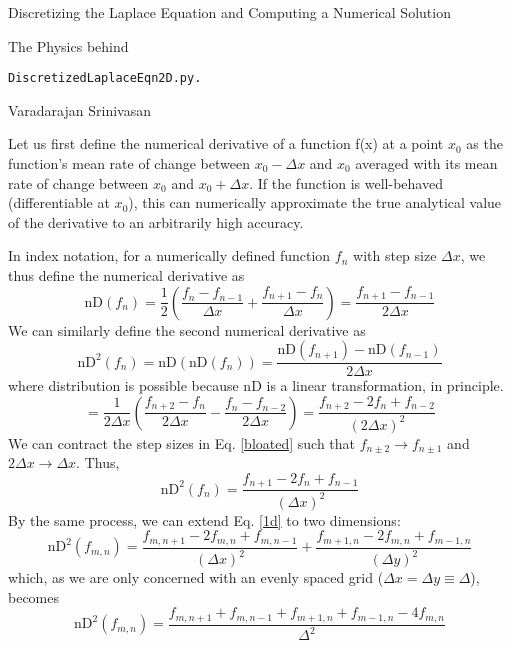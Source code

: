 \documentclass{article}
\begin{document}
\begin{flushleft}
{\large Discretizing the Laplace Equation and Computing a Numerical Solution}
\end{flushleft}
The Physics behind
\vspace{-2ex}
\begin{verbatim}
DiscretizedLaplaceEqn2D.py.
\end{verbatim}
\begin{flushright}
\smallskip
Varadarajan Srinivasan
\end{flushright}

\smallskip

Let us first define the numerical derivative of a function f(x) at a point $x_0$ as the function's mean rate of change between $x_0-\Delta x$ and $x_0$ averaged with its mean rate of change between $x_0$ and $x_0+\Delta x$. If the function is well-behaved (differentiable at $x_0$), this can numerically approximate the true analytical value of the derivative to an arbitrarily high accuracy.

In index notation, for a numerically defined function $f_n$ with step size $\Delta x$, we thus define the numerical derivative as
\begin{equation}
\mbox{nD}(f_n)=\frac{1}{2}\left(\frac{f_{n}-f_{n-1}}{\Delta x}+\frac{f_{n+1}-f_n}{\Delta x}\right)=\frac{f_{n+1}-f_{n-1}}{2\Delta x}
\end{equation}
We can similarly define the second numerical derivative as 
\begin{equation}
\mbox{nD}^2(f_n)=\mbox{nD}(\mbox{nD}(f_n))=\frac{\mbox{nD}(f_{n+1})-\mbox{nD}(f_{n-1})}{2\Delta x}
\end{equation}
where distribution is possible because nD is a linear transformation, in principle.
\begin{equation} \label{bloated}
=\frac{1}{2\Delta x}\left(\frac{f_{n+2}-f_{n}}{2\Delta x}-\frac{f_{n}-f_{n-2}}{2\Delta x}\right)=\frac{f_{n+2}-2f_{n}+f_{n-2}}{(2\Delta x)^2}
\end{equation}
We can contract the step sizes in Eq. \ref{bloated} such that $f_{n\pm 2}\rightarrow f_{n\pm 1}$ and $2\Delta x \rightarrow \Delta x$. Thus,
\begin{equation} \label{1d}
\mbox{nD}^2(f_n)=\frac{f_{n+1}-2f_{n}+f_{n-1}}{(\Delta x)^2}
\end{equation}
By the same process, we can extend Eq. \ref{1d} to two dimensions:
\begin{equation}
\mbox{nD}^2(f_{m,n})=\frac{f_{m,n+1}-2f_{m,n}+f_{m,n-1}}{(\Delta x)^2}+\frac{f_{m+1,n}-2f_{m,n}+f_{m-1,n}}{(\Delta y)^2}
\end{equation}
which, as we are only concerned with an evenly spaced grid ($\Delta x = \Delta y \equiv \Delta$), becomes
\begin{equation}
\mbox{nD}^2(f_{m,n})=\frac{f_{m,n+1}+f_{m,n-1}+f_{m+1,n}+f_{m-1,n}-4f_{m,n}}{\Delta^2}
\end{equation}
\end{document}
